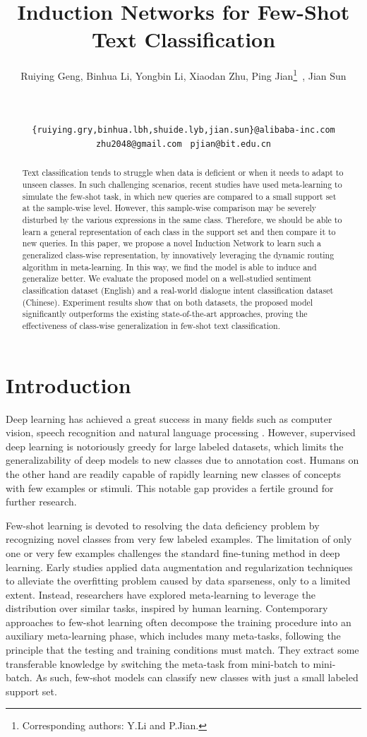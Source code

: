 \documentclass[11pt,a4paper]{article}
\title{Induction Networks for Few-Shot Text Classification}
\author{
  Ruiying Geng\affmark[1,2], Binhua Li\affmark[2], Yongbin Li\affmark[2] , Xiaodan Zhu\affmark[3], Ping Jian\affmark[1]\thanks{Corresponding authors: Y.Li and P.Jian.}\ , Jian Sun\affmark[2]\\
\affaddr{\affmark[1]School of Computer Science and Technology, Beijing Institute of Technology}\\
 \affaddr{\affmark[2] Alibaba Group, Beijing}\\
   \affaddr{\affmark[3] ECE, Queen's University}\\
{\tt \{ruiying.gry,binhua.lbh,shuide.lyb,jian.sun\}@alibaba-inc.com}\\
    {\tt zhu2048@gmail.com    }      {\tt pjian@bit.edu.cn} \\
}
\date{}
\begin{document}
\maketitle


\begin{abstract}
Text classification tends to struggle when data is deficient or when it needs to adapt to unseen classes. In such challenging scenarios, recent studies have used meta-learning to simulate the few-shot task, in which new queries are compared to a small support set at the sample-wise level. However, this sample-wise comparison may be severely disturbed by the various expressions in the same class. Therefore, we should be able to learn a general representation of each class in the support set and then compare it to new queries. In this paper, we propose a novel Induction Network to learn such a generalized class-wise representation, by innovatively leveraging the dynamic routing algorithm in meta-learning. In this way, we find the model is able to induce and generalize better. We evaluate the proposed model on a well-studied sentiment classification dataset (English) and a real-world dialogue intent classification dataset (Chinese). Experiment results show that on both datasets, the proposed model significantly outperforms the existing state-of-the-art approaches, proving the effectiveness of class-wise generalization in few-shot text classification.
\end{abstract}

\section{Introduction}
Deep learning has achieved a great success in many fields such as computer vision, speech recognition and natural language processing \citep{kuang2018attention}. 
However, supervised deep learning is notoriously greedy for large labeled datasets, which limits the generalizability of deep models to new classes due to annotation cost. 
Humans on the other hand are readily capable of rapidly learning new classes of concepts with few examples or stimuli. This notable gap provides a fertile ground for further research.


Few-shot learning is devoted to resolving the data deficiency problem by recognizing novel classes from very few labeled examples. The limitation of only one or very few examples challenges the standard fine-tuning method in deep learning. Early studies \citep{salamon2017deep} applied data augmentation and regularization techniques to alleviate the overfitting problem caused by data sparseness, only to a limited extent. Instead, researchers have explored meta-learning \citep{finn2017model} to leverage the distribution over similar tasks, inspired by human learning. Contemporary approaches to few-shot learning often decompose the training procedure into an auxiliary meta-learning phase, which includes many meta-tasks, following the principle that the testing and training conditions must match. They extract some transferable knowledge by switching the meta-task from mini-batch to mini-batch. As such, few-shot models can classify new classes with just a small labeled support set.
\end{document}
